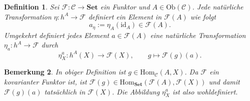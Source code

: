 \documentclass[a4paper, 11pt]{scrartcl}
\newcommand{\Hom}{\text{Hom}}
\newcommand{\id}{\text{id}}
\newcommand{\Ob}{\text{Ob}}
\theoremstyle{basicstyle}
\newtheorem{definition}{Definition}[section]
\newtheorem{bemerkung}[definition]{Bemerkung}
\begin{document}
    \begin{definition}
        Sei \(\mathcal{F}: \mathcal{C} \to \textbf{Set}\) ein Funktor und \(A \in \Ob(\mathcal{C})\).
        Jede natürliche Transformation \(\eta: h^A \to \mathcal{F}\) definiert ein Element in \(\mathcal{F}(A)\) wie folgt
        \[a_{\eta} := \eta_A(\id_A) \in \mathcal{F}(A).\]
        Umgekehrt definiert jedes Element \(a \in \mathcal{F}(A)\) eine natürliche Transformation \(\eta_a: h^A \to \mathcal{F}\) durch
        \[\eta_X^a: h^A(X) \longrightarrow \mathcal{F}(X), \qquad g \mapsto \mathcal{F}(g)(a).\]
    \end{definition}

    \begin{bemerkung}
        In obiger Definition ist \(g \in \Hom_{\mathcal{C}}(A, X)\).
        Da \(\mathcal{F}\) ein kovarianter Funktor ist, ist \(\mathcal{F}(g) \in \Hom_{\textbf{Set}}(\mathcal{F}(A), \mathcal{F}(X))\) und damit \(\mathcal{F}(g)(a)\) tatsächlich in \(\mathcal{F}(X)\).
        Die Abbildung \(\eta_X^a\) ist also wohldefiniert.
    \end{bemerkung}
\end{document}
